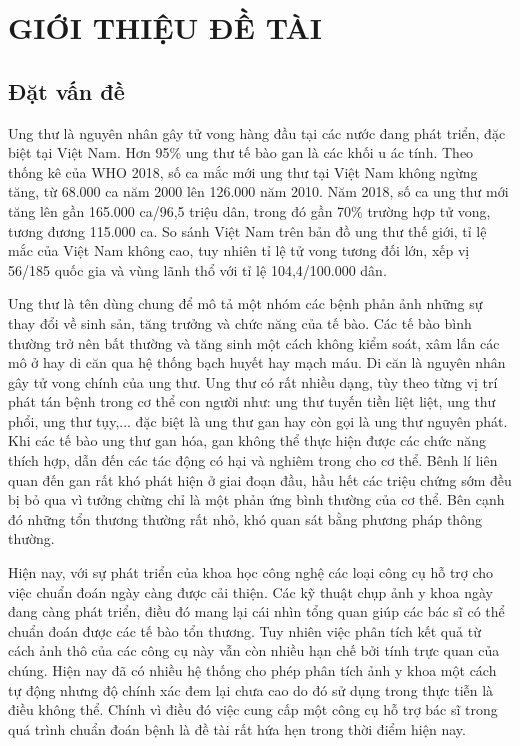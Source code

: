 \chapter{GIỚI THIỆU ĐỀ TÀI}\label{chapter:introduction}
\pagestyle{fancy}

\section{Đặt vấn đề}
Ung thư là nguyên nhân gây tử vong hàng đầu tại các nước đang phát triển, đặc biệt tại Việt Nam. Hơn 95\% ung thư tế bào gan là các khối u ác tính.  Theo thống kê của WHO 2018, số ca mắc mới ung thư tại Việt Nam không ngừng tăng, từ 68.000 ca năm 2000 lên 126.000 năm 2010. Năm 2018, số ca ung thư mới tăng lên gần 165.000 ca/96,5 triệu dân, trong đó gần 70\% trường hợp tử vong, tương đương 115.000 ca. So sánh Việt Nam trên bản đồ ung thư thế giới, tỉ lệ mắc của Việt Nam không cao, tuy nhiên tỉ lệ tử vong tương đối lớn, xếp vị 56/185 quốc gia và vùng lãnh thổ với tỉ lệ 104,4/100.000 dân.\par

Ung thư là tên dùng chung để mô tả một nhóm các bệnh phản ảnh những sự thay đổi về sinh sản, tăng trưởng và chức năng của tế bào. Các tế bào bình thường trở nên bất thường và tăng sinh một cách không kiểm soát, xâm lấn các mô ở hay di căn qua hệ thống bạch huyết hay mạch máu. Di căn là nguyên nhân gây tử vong chính của ung thư. Ung thư có rất nhiều dạng, tùy theo từng vị trí phát tán bệnh trong cơ thể con người như: ung thư tuyến tiền liệt liệt, ung thư phổi, ung thư tụy,... đặc biệt là ung thư gan hay còn gọi là ung thư nguyên phát. Khi các tế bào ung thư gan hóa, gan không thể thực hiện được các chức năng thích hợp, dẫn đến các tác động có hại và nghiêm trong cho cơ thể. Bênh lí liên quan đến gan rất khó phát hiện ở giai đoạn đầu, hầu hết các triệu chứng sớm đều bị bỏ qua vì tưởng chừng chỉ là một phản ứng bình thường của cơ thể. Bên cạnh đó những tổn thương thường rất nhỏ, khó quan sát bằng phương pháp thông thường.\par 

Hiện nay, với sự phát triển của khoa học công nghệ các loại công cụ hỗ trợ cho việc chuẩn đoán ngày càng được cải thiện. Các kỹ thuật chụp ảnh y khoa ngày đang càng phát triển, điều đó mang lại cái nhìn tổng quan giúp các bác sĩ có thể chuẩn đoán được các tế bào tổn thương. Tuy nhiên việc phân tích kết quả từ cách ảnh thô của các công cụ này vẫn còn nhiều hạn chế bởi tính trực quan của chúng. Hiện nay đã có nhiều hệ thống cho phép phân tích ảnh y khoa một cách tự động nhưng độ chính xác đem lại chưa cao do đó sử dụng trong thực tiễn là điều không thể. Chính vì điều đó việc cung cấp một công cụ hỗ trợ bác sĩ trong quá trình chuẩn đoán bệnh là đề tài rất hứa hẹn trong thời điểm hiện nay.\par

